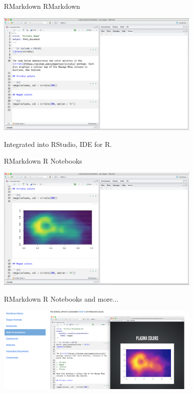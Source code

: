 \begin{frame}{RMarkdown}
RMarkdown

\begin{center}
    \includegraphics[width=10cm]{07_notebook/images/rmarkdown_file.png}
\end{center}

Integrated into RStudio, IDE for R.

\end{frame}

\begin{frame}{RMarkdown}
R Notebooks

\begin{center}
    \includegraphics[width=10cm]{07_notebook/images/rmarkdown_notebook.png}
\end{center}


\end{frame}

\begin{frame}{RMarkdown}
R Notebooks and more...

\begin{center}
    \includegraphics[width=10cm]{07_notebook/images/rmarkdown_etc.png}
\end{center}

\end{frame}

